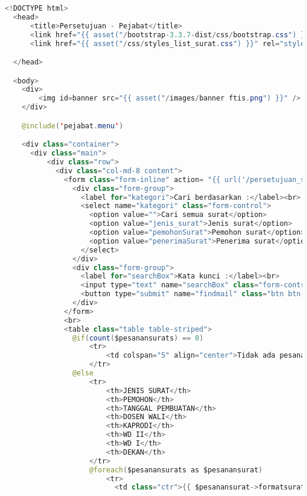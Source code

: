 \begin{lstlisting}[language=Java,basicstyle=\tiny,caption=Persetujuan pejabat]
<!DOCTYPE html>
  <head>
      <title>Persetujuan - Pejabat</title>
      <link href="{{ asset("/bootstrap-3.3.7-dist/css/bootstrap.css") }}" rel="stylesheet" type="text/css" />
      <link href="{{ asset("/css/styles_list_surat.css") }}" rel="stylesheet" type="text/css">

  </head>

  <body>
    <div>
        <img id=banner src="{{ asset("/images/banner ftis.png") }}" />
    </div>

    @include('pejabat.menu')

    <div class="container">
      <div class="main">
          <div class="row">
            <div class="col-md-8 content">
              <form class="form-inline" action= "{{ url('/persetujuan_surat') }}" method="get">
                <div class="form-group">
                  <label for="kategori">Cari berdasarkan :</label><br>
                  <select name="kategori" class="form-control">
                    <option value="">Cari semua surat</option>
                    <option value="jenis_surat">Jenis surat</option>
                    <option value="pemohonSurat">Pemohon surat</option>
                    <option value="penerimaSurat">Penerima surat</option>
                  </select>
                </div>
                <div class="form-group">
                  <label for="searchBox">Kata kunci :</label><br>
                  <input type="text" name="searchBox" class="form-control" size="69" />
                  <button type="submit" name="findmail" class="btn btn-primary">Cari surat</button>
                </div>
              </form>
              <br>
              <table class="table table-striped">
                @if(count($pesanansurats) == 0)
                    <tr>
                        <td colspan="5" align="center">Tidak ada pesanan surat ...</td>
                    </tr>
                @else
                    <tr>
                        <th>JENIS SURAT</th>
                        <th>PEMOHON</th>
                        <th>TANGGAL PEMBUATAN</th>
                        <th>DOSEN WALI</th>
                        <th>KAPRODI</th>
                        <th>WD II</th>
                        <th>WD I</th>
                        <th>DEKAN</th>
                    </tr>
                    @foreach($pesanansurats as $pesanansurat)
                        <tr>
                          <td class="ctr">{{ $pesanansurat->formatsurat->jenis_surat }}</td>

\end{lstlisting}
